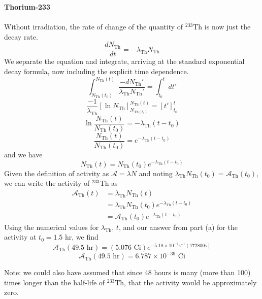 \documentclass{report}
\begin{document}
\textbf{Thorium-233}\\
\-\\
Without irradiation, the rate of change of the quantity of $^{233}$Th is now just the decay rate. 
$$ \frac{dN_{\text{Th}}}{dt} = -\lambda_{\text{Th}}N_{\text{Th}} $$
We separate the equation and integrate, arriving at the standard exponential decay formula, now including the explicit time dependence.
$$ \int_{N_{\text{Th}}(t_0)}^{N_{\text{Th}}(t)} \frac{-dN_{\text{Th}}'}{\lambda_{\text{Th}}N_{\text{Th}}'} = \int_{t_0}^{t} dt' $$
$$ \frac{-1}{\lambda_{\text{Th}}}\left[ \ln{N_{\text{Th}}} \right]_{N_{\text{Th}(t_0)}}^{N_{\text{Th}}(t)} = \left[t'\right]_{t_0}^{t} $$
$$ \ln\frac{N_{\text{Th}}(t)}{N_{\text{Th}}(t_0)}  = -\lambda_{\text{Th}}(t-t_0) $$
$$ \frac{N_{\text{Th}}(t)}{N_{\text{Th}}(t_0)}  = e^{-\lambda_{\text{Th}}(t-t_0)} $$
and we have 
$$ N_{\text{Th}}(t) = N_{\text{Th}}(t_0) e^{-\lambda_{\text{Th}}\left(t-t_0\right)} $$
Given the definition of activity as $\mathcal{A} = \lambda N$ and noting $\lambda_{\text{Th}} N_{\text{Th}}(t_0) = \mathcal{A}_{\text{Th}}(t_0)$, we can write the activity of $^{233}$Th as
\begin{align*}
\mathcal{A}_{\text{Th}}(t)	&= \lambda_{\text{Th}} N_{\text{Th}}(t) \\
							&= \lambda_{\text{Th}} N_{\text{Th}}(t_0) e^{-\lambda_{\text{Th}}(t-t_0)} \\ 
							&= \mathcal{A}_{\text{Th}}(t_0) e^{-\lambda_{\text{Th}}(t-t_0)}
\end{align*}
Using the numerical values for $\lambda_{\text{Th}}$, $t$, and our answer from part (a) for the activity at $t_0=1.5$ hr, we find
$$ \mathcal{A}_{\text{Th}}(49.5\text{ hr}) = (5.076 \text{ Ci})e^{-5.18\times10^{-4}\text{s}^{-1} (172800\text{s})} $$
$$ \boxed{\mathcal{A}_{\text{Th}}(49.5\text{ hr}) = 6.787\times10^{-39}\text{ Ci}} $$

{\small Note: we could also have assumed that since 48 hours is many (more than 100) times longer than the half-life of $^{233}$Th, that the activity would be approximately zero.}
\-\\
\-\\
\end{document}
